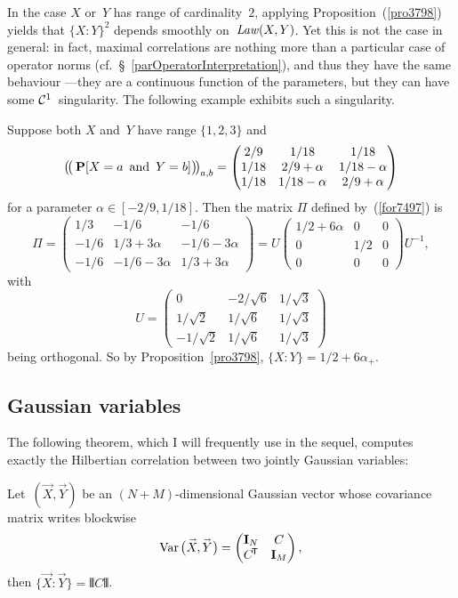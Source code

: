 \begin{Rmk}
In the case $X$ or~$Y$ has range of cardinality~$2$,
applying Proposition~(\ref{pro3798}) yields that ${\{X:Y\}}^2$ depends smoothly on~$\operatorname{\mathit{Law}}(X,Y)$.
Yet this is not the case in general:
in fact, maximal correlations are nothing more than a particular case of operator norms
(cf.~\S~\ref{parOperatorInterpretation}), and thus they have the same behaviour%
—they are a continuous function of the parameters,
but they can have some $\mathcal{C}^1$~singularity.
The following example exhibits such a singularity.
\end{Rmk}

\begin{Xpl}
Suppose both $X$ and~$Y$ have range $\{1,2,3\}$ and
\[\label{for3787} \big(\!\big( \Pr[X=a\enskip\text{and}\enskip Y=b] \big)\!\big)_{a,b}
= \begin{pmatrix} 2/9 & 1/18 & 1/18 \\
1/18 & 2/9+\alpha & 1/18-\alpha \\
1/18 & 1/18-\alpha & 2/9+\alpha \end{pmatrix} \]
for a parameter $\alpha \in [-2/9,1/18]$.
Then the matrix $\Pi$ defined by~(\ref{for7497}) is
\[ \Pi = \begin{pmatrix} 1/3 & -1/6 & -1/6 \\
-1/6 & 1/3+3\alpha & -1/6-3\alpha \\
-1/6 & -1/6-3\alpha & 1/3+3\alpha \end{pmatrix}
= U \begin{pmatrix} 1/2+6\alpha & 0 & 0 \\
0 & 1/2 & 0 \\ 0 & 0 & 0 \end{pmatrix} U^{-1} ,\]
with
\[ U = \begin{pmatrix} 0 & -2/\sqrt{6} & 1/\sqrt{3} \\
1/\sqrt{2} & 1/\sqrt{6} & 1/\sqrt{3} \\
-1/\sqrt{2} & 1/\sqrt{6} & 1/\sqrt{3} \end{pmatrix} \]
being orthogonal.
So by Proposition~\ref{pro3798}, ${\{X:Y\}} = 1/2 + 6\alpha_+$.
\end{Xpl}


\subsection{Gaussian variables}

The following theorem, which I will frequently use in the sequel, computes exactly the Hilbertian correlation between two jointly Gaussian variables:
%
\begin{Thm}\label{pro1857}
Let~$(\vec{X},\vec{Y})$ be an $(N+M)$-dimensional Gaussian vector
whose covariance matrix writes blockwise
\[ \Var\big( \vec{X},\vec{Y} \big) = \begin{pmatrix} \mathbf{I}_N & C \\
\T{C} & \mathbf{I}_M \end{pmatrix}, \]
then $\{\vec{X}:\vec{Y}\} = \VERT C \VERT$.
\end{Thm}

